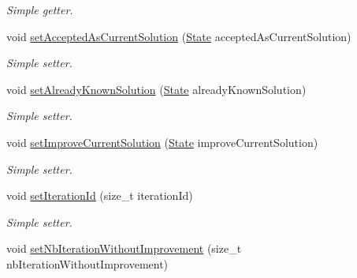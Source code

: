 \begin{DoxyCompactItemize}
\begin{DoxyCompactList}\small\item\em Simple getter. \end{DoxyCompactList}\item 
\hypertarget{classALNS__Iteration__Status_a9b9cc03cf195a9079704d4675e0b78aa}{void \hyperlink{classALNS__Iteration__Status_a9b9cc03cf195a9079704d4675e0b78aa}{set\-Accepted\-As\-Current\-Solution} (\hyperlink{classALNS__Iteration__Status_a6d748b05080edeab9e82ac32c9904133}{State} accepted\-As\-Current\-Solution)}\label{classALNS__Iteration__Status_a9b9cc03cf195a9079704d4675e0b78aa}

\begin{DoxyCompactList}\small\item\em Simple setter. \end{DoxyCompactList}\item 
\hypertarget{classALNS__Iteration__Status_ac8c5a5db9230c5a55c971ee11abced9a}{void \hyperlink{classALNS__Iteration__Status_ac8c5a5db9230c5a55c971ee11abced9a}{set\-Already\-Known\-Solution} (\hyperlink{classALNS__Iteration__Status_a6d748b05080edeab9e82ac32c9904133}{State} already\-Known\-Solution)}\label{classALNS__Iteration__Status_ac8c5a5db9230c5a55c971ee11abced9a}

\begin{DoxyCompactList}\small\item\em Simple setter. \end{DoxyCompactList}\item 
\hypertarget{classALNS__Iteration__Status_a6ecfed253c531820cf90016753e0a6c1}{void \hyperlink{classALNS__Iteration__Status_a6ecfed253c531820cf90016753e0a6c1}{set\-Improve\-Current\-Solution} (\hyperlink{classALNS__Iteration__Status_a6d748b05080edeab9e82ac32c9904133}{State} improve\-Current\-Solution)}\label{classALNS__Iteration__Status_a6ecfed253c531820cf90016753e0a6c1}

\begin{DoxyCompactList}\small\item\em Simple setter. \end{DoxyCompactList}\item 
\hypertarget{classALNS__Iteration__Status_a0bf1e96a39704e945dc2505bbf6f73ea}{void \hyperlink{classALNS__Iteration__Status_a0bf1e96a39704e945dc2505bbf6f73ea}{set\-Iteration\-Id} (size\-\_\-t iteration\-Id)}\label{classALNS__Iteration__Status_a0bf1e96a39704e945dc2505bbf6f73ea}

\begin{DoxyCompactList}\small\item\em Simple setter. \end{DoxyCompactList}\item 
\hypertarget{classALNS__Iteration__Status_a98c4b0753e01bc625fa43c35e02d47ec}{void \hyperlink{classALNS__Iteration__Status_a98c4b0753e01bc625fa43c35e02d47ec}{set\-Nb\-Iteration\-Without\-Improvement} (size\-\_\-t nb\-Iteration\-Without\-Improvement)}\label{classALNS__Iteration__Status_a98c4b0753e01bc625fa43c35e02d47ec}


\end{DoxyCompactItemize}
